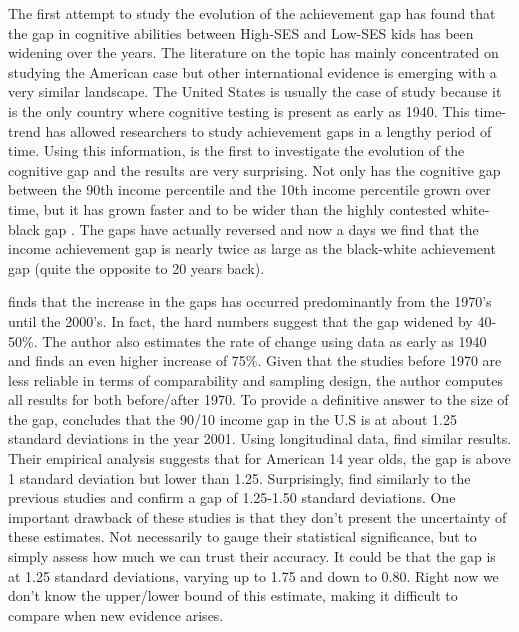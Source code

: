\documentclass[11pt, a4paper]{article}\usepackage[]{graphicx}\usepackage[]{color}
\begin{document}
The first attempt to study the evolution of the achievement gap has found that the gap in cognitive abilities between High-SES and Low-SES kids has been widening over the years. The literature on the topic has mainly concentrated on studying the American case \citep{reardon2011} but other international evidence is emerging with a very similar landscape. The United States is usually the case of study because it is the only country where cognitive testing is present as early as 1940. This time-trend has allowed researchers to study achievement gaps in a lengthy period of time. Using this information, \citet{reardon2011} is the first to investigate the evolution of the cognitive gap and the results are very surprising. Not only has the cognitive gap between the 90th income percentile and the 10th income percentile grown over time, but it has grown faster and to be wider than the highly contested white-black gap \citep{magnuson2008}. The gaps have actually reversed and now a days we find that the income achievement gap is nearly twice as large as the black-white achievement gap (quite the opposite to 20 years back).

\citet{reardon2011} finds that the increase in the gaps has occurred predominantly from the 1970's until the 2000's. In fact, the hard numbers suggest that the gap widened by 40-50\%. The author also estimates the rate of change using data as early as 1940 and finds an even higher increase of   75\%. Given that the studies before 1970 are less reliable in terms of comparability and sampling design, the author computes all results for both before/after 1970. To provide a definitive answer to the size of the gap, \citet{reardon2011} concludes that the 90/10 income gap in the U.S is at about 1.25 standard deviations in the year 2001. Using longitudinal data, \citet{bradbury2015} find similar results. Their empirical analysis suggests that for American 14 year olds, the gap is above 1 standard deviation but lower than 1.25. Surprisingly, \citet{duncan2011} find similarly to the previous studies and confirm a gap of  1.25-1.50 standard deviations. One important drawback of these studies is that they don't present the uncertainty of these estimates. Not necessarily to gauge their statistical significance, but to simply assess how much we can trust their accuracy. It could be that the gap is at 1.25 standard deviations, varying up to 1.75 and down to 0.80. Right now we don't know the upper/lower bound of this estimate, making it difficult to compare when new evidence arises.
\end{document}
